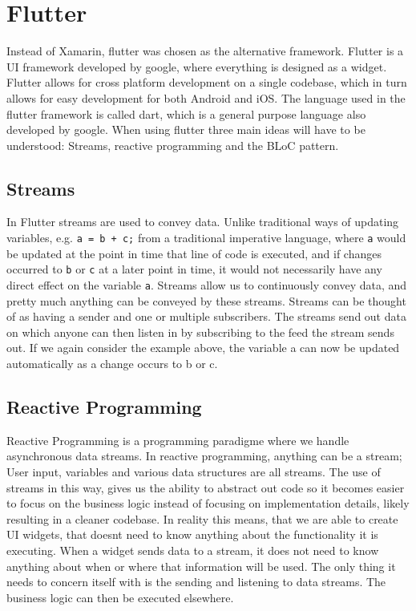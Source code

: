 \section{Flutter}
Instead of Xamarin, flutter was chosen as the alternative framework.
Flutter is a UI framework developed by google, where everything is designed as a widget.
Flutter allows for cross platform development on a single codebase, which in turn allows for easy development for both Android and iOS.
The language used in the flutter framework is called dart, which is a general purpose language also developed by google.
When using flutter three main ideas will have to be understood:
Streams, reactive programming and the BLoC pattern.

\subsection{Streams}
In Flutter streams are used to convey data.
Unlike traditional ways of updating variables, e.g. \lstinline{a = b + c;} from a traditional imperative language, where \lstinline{a} would be updated at the point in time that line of code is executed, and if changes occurred to \lstinline{b} or \lstinline{c} at a later point in time, it would not necessarily have any direct effect on the variable \lstinline{a}.
Streams allow us to continuously convey data, and pretty much anything can be conveyed by these streams.
Streams can be thought of as having a sender and one or multiple subscribers.
The streams send out data on which anyone can then listen in by subscribing to the feed the stream sends out.
If we again consider the example above, the variable a can now be updated automatically as a change occurs to b or c.
\subsection{Reactive Programming}
Reactive Programming is a programming paradigme where we handle asynchronous data streams. 
In reactive programming, anything can be a stream; User input, variables and various data structures are all streams. The use of streams in this way, gives us the ability to abstract out code so it becomes easier to focus on the business logic instead of focusing on implementation details, likely resulting in a cleaner codebase.
In reality this means, that we are able to create UI widgets, that doesnt need to know anything about the functionality it is executing. 
When a widget sends data to a stream, it does not need to know anything about when or where that information will be used. The only thing it needs to concern itself with is the sending and listening to data streams. The business logic can then be executed elsewhere. 
